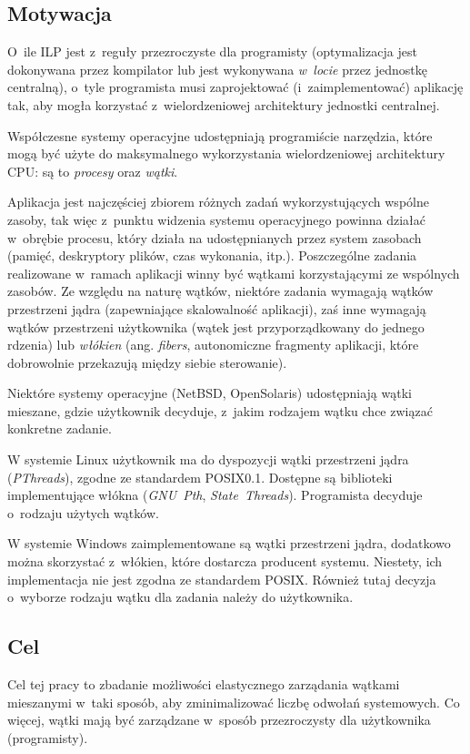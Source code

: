 \subsection{Motywacja} 
%
\indent
	O~ile ILP jest z~reguły przezroczyste dla programisty (optymalizacja jest dokonywana przez kompilator lub jest wykonywana \emph{w~locie}
	przez jednostkę centralną),	o~tyle programista musi zaprojektować (i~zaimplementować) aplikację tak, aby mogła korzystać z~wielordzeniowej
	architektury jednostki centralnej.
\par
%
\indent
	Współczesne systemy operacyjne udostępniają programiście narzędzia, które mogą być użyte do maksymalnego wykorzystania 
	wielordzeniowej architektury CPU: są to \emph{procesy} oraz \emph{wątki}.
\par
%
\indent
	Aplikacja jest najczęściej zbiorem różnych zadań wykorzystujących wspólne zasoby, tak więc z~punktu widzenia systemu operacyjnego 
	powinna działać w~obrębie procesu, który działa na udostępnianych przez system zasobach (pamięć, deskryptory plików, czas wykonania, itp.).
	Poszczególne zadania realizowane w~ramach aplikacji winny być wątkami korzystającymi ze wspólnych zasobów.
	Ze względu na naturę wątków, niektóre zadania wymagają wątków przestrzeni jądra (zapewniające skalowalność aplikacji), zaś inne wymagają
	wątków przestrzeni użytkownika (wątek jest przyporządkowany do jednego rdzenia) lub \emph{włókien} (ang. \emph{fibers}, autonomiczne fragmenty
	aplikacji, które dobrowolnie przekazują między siebie sterowanie).
\par
%
\indent
	Niektóre systemy operacyjne (NetBSD, OpenSolaris) udostępniają wątki mieszane, gdzie użytkownik decyduje, z~jakim rodzajem wątku 
	chce związać konkretne zadanie.
\par
%
\indent
	W systemie Linux użytkownik ma do dyspozycji wątki przestrzeni jądra \linebreak (\emph{PThreads}), zgodne ze standardem POSIX0.1.
	Dostępne są biblioteki implementujące włókna (\emph{GNU~Pth}, \emph{State~Threads}). Programista decyduje o~rodzaju użytych wątków.
\par
%
\indent
	W systemie Windows zaimplementowane są wątki przestrzeni jądra, dodatkowo można skorzystać z~włókien, które dostarcza producent systemu.
	Niestety, ich implementacja nie jest zgodna ze standardem POSIX. Również tutaj decyzja o~wyborze rodzaju wątku dla zadania należy do użytkownika.
\par
%
\subsection{Cel}
%
\indent
	Cel tej pracy to zbadanie możliwości elastycznego zarządania wątkami mieszanymi w~taki sposób, aby zminimalizować liczbę odwołań systemowych.
	Co więcej, wątki mają być zarządzane w~sposób przezroczysty dla użytkownika (programisty). 
\par
